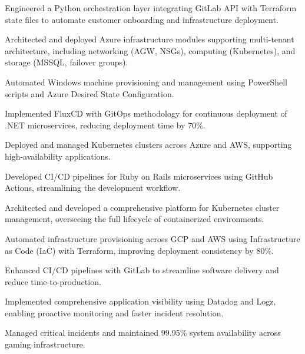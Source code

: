 \documentclass[]{deedy-resume-pdflatex}
\begin{document}
\begin{minipage}[t]{0.65\textwidth}

\vspace{\topsep} %
\begin{tightemize}
\item Engineered a Python orchestration layer integrating GitLab API with Terraform state files to automate customer onboarding and infrastructure deployment.
\item Architected and deployed Azure infrastructure modules supporting multi-tenant architecture, including networking (AGW, NSGs), computing (Kubernetes), and storage (MSSQL, failover groups).
\item Automated Windows machine provisioning and management using PowerShell scripts and Azure Desired State Configuration.
\item Implemented FluxCD with GitOps methodology for continuous deployment of .NET microservices, reducing deployment time by 70\%.
\item Deployed and managed Kubernetes clusters across Azure and AWS, supporting high-availability applications.
\item Developed CI/CD pipelines for Ruby on Rails microservices using GitHub Actions, streamlining the development workflow.
\end{tightemize}
\sectionsep


\vspace{\topsep} %
\begin{tightemize}
\item Architected and developed a comprehensive platform for Kubernetes cluster management, overseeing the full lifecycle of containerized environments.
\item Automated infrastructure provisioning across GCP and AWS using Infrastructure as Code (IaC) with Terraform, improving deployment consistency by 80\%.
\item Enhanced CI/CD pipelines with GitLab to streamline software delivery and reduce time-to-production.
\item Implemented comprehensive application visibility using Datadog and Logz, enabling proactive monitoring and faster incident resolution.
\item Managed critical incidents and maintained 99.95\% system availability across gaming infrastructure.
\end{tightemize}
\sectionsep


\end{minipage}
\end{document}

